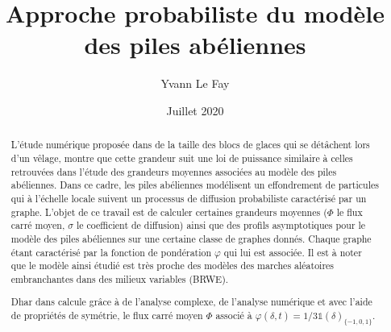 \documentclass{article}
\theoremstyle{definition}
\begin{document}
\title{Approche probabiliste du modèle des piles abéliennes}
\author{Yvann Le Fay}
\date{Juillet 2020}
\maketitle
\begin{abstract}
	L'étude numérique proposée dans \cite{TGCCS} de la taille des blocs de glaces qui se détâchent lors d'un vêlage, montre que cette grandeur suit une loi de puissance similaire à celles retrouvées dans l'étude des grandeurs moyennes associées au modèle des piles abéliennes. Dans ce cadre, les piles abéliennes modélisent un effondrement de particules qui à l'échelle locale suivent un processus de diffusion probabiliste caractérisé par un graphe. 	
	L'objet de ce travail est de calculer certaines grandeurs moyennes ($\Phi$ le flux carré moyen, $\sigma$ le coefficient de diffusion) ainsi que des profils asymptotiques pour le modèle des piles abéliennes sur une certaine classe de graphes donnés. Chaque graphe étant caractérisé par la fonction de pondération $\varphi$ qui lui est associée. Il est à noter que le modèle ainsi étudié est très proche des modèles des marches aléatoires embranchantes dans des milieux variables (BRWE).
	
	Dhar dans \cite{DHARBIS} calcule grâce à de l'analyse complexe, de l'analyse numérique et avec l'aide de propriétés de symétrie, le flux carré moyen $\Phi$ associé à $\varphi(\delta,t)=1/3\mathds{1}(\delta)_{\{-1,0,1\}}$.    
	

\end{abstract}
\end{document}
